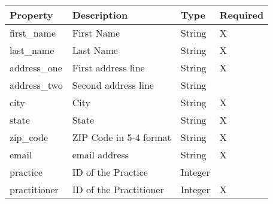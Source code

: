 \documentclass[letterpaper,10pt,english]{sphinxmanual}
\begin{document}
\begin{tabulary}{\linewidth}{|L|L|L|L|}
\hline
\textsf{\relax 
Property
} & \textsf{\relax 
Description
} & \textsf{\relax 
Type
} & \textsf{\relax 
Required
}\\
\hline
first\_name
 & 
First Name
 & 
String
 & 
X
\\

last\_name
 & 
Last Name
 & 
String
 & 
X
\\

address\_one
 & 
First address line
 & 
String
 & 
X
\\

address\_two
 & 
Second address line
 & 
String
 & \\

city
 & 
City
 & 
String
 & 
X
\\

state
 & 
State
 & 
String
 & 
X
\\

zip\_code
 & 
ZIP Code in 5-4 format
 & 
String
 & 
X
\\

email
 & 
email address
 & 
String
 & 
X
\\

practice
 & 
ID of the Practice
 & 
Integer
 & \\

practitioner
 & 
ID of the Practitioner
 & 
Integer
 & 
X
\\
\hline\end{tabulary}
\end{document}
